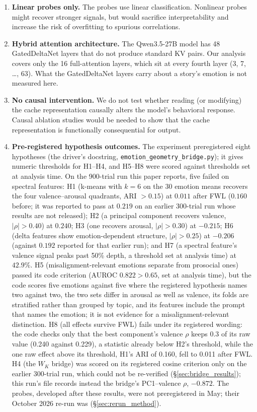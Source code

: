 \documentclass[11pt,a4paper]{article}
\begin{document}
\begin{enumerate}[nosep]
    \item \textbf{Linear probes only.} The probes use linear classification. Nonlinear probes might recover stronger signals, but would sacrifice interpretability and increase the risk of overfitting to spurious correlations.

    \item \textbf{Hybrid attention architecture.} The Qwen3.5-27B model has 48 GatedDeltaNet layers that do not produce standard KV pairs. Our analysis covers only the 16 full-attention layers, which sit at every fourth layer (3, 7, \ldots, 63). What the GatedDeltaNet layers carry about a story's emotion is not measured here.

    \item \textbf{No causal intervention.} We do not test whether reading (or modifying) the cache representation causally alters the model's behavioral response. Causal ablation studies would be needed to show that the cache representation is functionally consequential for output.

    \item \textbf{Pre-registered hypothesis outcomes.} The experiment preregistered eight hypotheses (the driver's docstring, \texttt{emotion\_geometry\_bridge.py}); it gives numeric thresholds for H1--H4, and H5--H8 were scored against thresholds set at analysis time. On the 900-trial run this paper reports, five failed on spectral features: H1 (k-means with $k = 6$ on the 30 emotion means recovers the four valence--arousal quadrants, ARI $> 0.15$) at $0.011$ after FWL ($0.160$ before; it was reported to pass at $0.219$ on an earlier 300-trial run whose results are not released); H2 (a principal component recovers valence, $|\rho| > 0.40$) at $0.240$; H3 (one recovers arousal, $|\rho| > 0.30$) at $-0.215$; H6 (delta features show emotion-dependent structure, $|\rho| > 0.25$) at $-0.206$ (against $0.192$ reported for that earlier run); and H7 (a spectral feature's valence signal peaks past 50\% depth, a threshold set at analysis time) at $42.9\%$. H5 (misalignment-relevant emotions separate from prosocial ones) passed its code criterion (AUROC $0.822 > 0.65$, set at analysis time), but the code scores five emotions against five where the registered hypothesis names two against two, the two sets differ in arousal as well as valence, its folds are stratified rather than grouped by topic, and its features include the prompt that names the emotion; it is not evidence for a misalignment-relevant distinction. H8 (all effects survive FWL) fails under its registered wording: the code checks only that the best component's valence $\rho$ keeps 0.3 of its raw value (0.240 against 0.229), a statistic already below H2's threshold, while the one raw effect above its threshold, H1's ARI of 0.160, fell to 0.011 after FWL. H4 (the $W_K$ bridge) was scored on its registered cosine criterion only on the earlier 300-trial run, which could not be re-verified (\S\ref{sec:bridge_results}); this run's file records instead the bridge's PC1--valence $\rho$, $-0.872$. The probes, developed after these results, were not preregistered in May; their October 2026 re-run was (\S\ref{sec:rerun_method}).


\end{enumerate}
\end{document}
